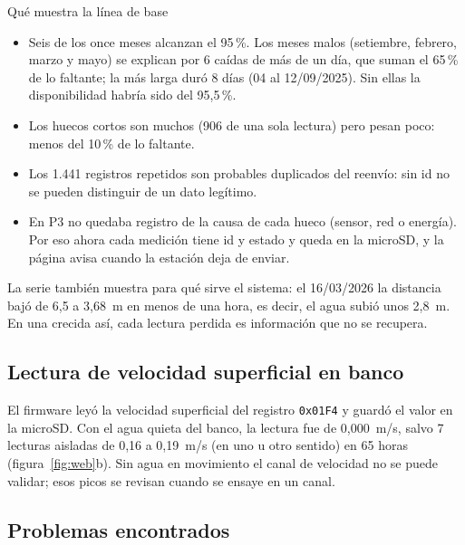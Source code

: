\documentclass[11pt,a4paper]{article}
\begin{document}
\begin{resultado}{Qué muestra la línea de base}
\begin{itemize}
    \item Seis de los once meses alcanzan el 95\,\%. Los meses malos (setiembre,
        febrero, marzo y mayo) se explican por 6 caídas de más de un
        día, que suman el 65\,\% de lo faltante; la más larga duró 8 días
        (04 al 12/09/2025). Sin ellas la disponibilidad habría sido del
        95,5\,\%.
    \item Los huecos cortos son muchos (906 de una sola lectura) pero pesan
        poco: menos del 10\,\% de lo faltante.
    \item Los 1.441 registros repetidos son probables duplicados del reenvío:
        sin id no se pueden distinguir de un dato legítimo.
    \item En P3 no quedaba registro de la causa de cada hueco (sensor, red o
        energía). Por eso ahora cada medición tiene id y
        estado y queda en la microSD, y la página avisa cuando la
        estación deja de enviar.
\end{itemize}
\end{resultado}

La serie también muestra para qué sirve el sistema: el 16/03/2026 la distancia
bajó de 6,5 a 3,68~m en menos de una hora, es decir, el agua subió unos 2,8~m.
En una crecida así, cada lectura perdida es información que no se recupera.

\subsection{Lectura de velocidad superficial en banco}

El firmware leyó la velocidad superficial del registro \texttt{0x01F4} y guardó
el valor en la microSD. Con el agua quieta del banco, la lectura fue de
0,000~m/s, salvo 7 lecturas aisladas de 0,16 a 0,19~m/s (en uno u otro sentido)
en 65 horas (figura~\ref{fig:web}b). Sin agua en movimiento el canal de velocidad no se
puede validar; esos picos se revisan cuando se ensaye en un canal.

\subsection{Problemas encontrados}
\end{document}
